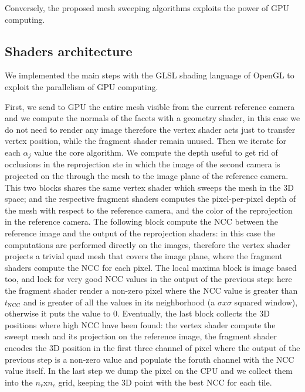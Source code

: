 Conversely, the proposed mesh sweeping algorithms exploits the power of GPU computing. 
\subsection{Shaders architecture}
We implemented the main steps with the GLSL shading language of OpenGL \cite{opengl} to exploit the parallelism of GPU computing.


First, we send to GPU the entire mesh visible from the current reference camera and we compute the normals of the facets with a geometry shader, in this case we do not need to render any image therefore the vertex shader acts just to transfer vertex position, while the fragment shader remain unused.
Then we iterate for each $\alpha_j$ value the core algorithm. 
We compute the depth useful to get rid of occlusions in the reprojection ste in which the image of the second camera is projected on the through the mesh to the image plane of the reference camera. 
This two blocks shares the same vertex shader which sweeps the mesh in the 3D space; and the respective fragment shaders computes the pixel-per-pixel depth of the mesh with respect to the reference camera, and the color of the reprojection in the reference camera.
The following block compute the NCC between the reference image and the output of the reprojection shaders: in this case the computations are performed directly on the images, therefore the vertex shader projects a trivial quad mesh that covers the image plane, where the fragment shaders compute the NCC for each pixel.
The local maxima block is image based too, and lock for very good NCC values in the output of the previous step: here the fragment shader render a non-zero pixel where the NCC value is greater than $t_{\text{NCC}}$ and is greater of all the values in its neighborhood (a $\sigma x \sigma$ squared window), otherwise it puts the value to $0$.
Eventually, the last block collects the 3D positions where high NCC have been found: the vertex shader compute the sweept mesh and its projection on the reference image, the fragment shader encodes the 3D position in the first three channel of pixel where the output of the previous step is a non-zero value and populate the foruth channel with the NCC value itself.
In the last step we dump the pixel on the CPU and we collect them into the $n_r$x$n_c$ grid, keeping the 3D point with the best NCC for each tile.



